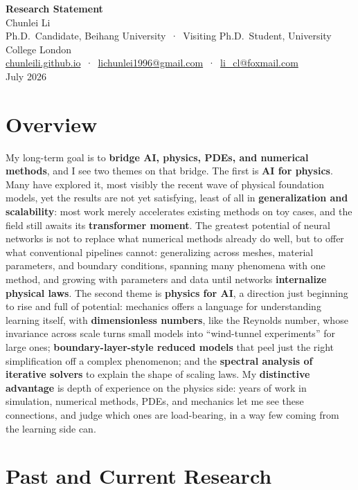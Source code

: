 \documentclass[11pt]{article}
\newcommand{\kw}[1]{\textcolor{linkblue}{\textbf{#1}}}
\begin{document}
\begin{center}
  {\LARGE\bfseries Research Statement}\\[6pt]
  {\large Chunlei Li}\\[2pt]
  Ph.D.\ Candidate, Beihang University \,·\, Visiting Ph.D.\ Student, University College London\\
  \href{https://chunleili.github.io/}{chunleili.github.io} \,·\, \href{mailto:lichunlei1996@gmail.com}{lichunlei1996@gmail.com} \,·\, \href{mailto:li_cl@foxmail.com}{li\_cl@foxmail.com}\\[3pt]
  July 2026
\end{center}

\section{Overview}

My long-term goal is to \kw{bridge AI, physics, PDEs, and numerical methods}, and I see two themes on that bridge. The first is \kw{AI for physics}. Many have explored it, most visibly the recent wave of physical foundation models, yet the results are not yet satisfying, least of all in \kw{generalization and scalability}: most work merely accelerates existing methods on toy cases, and the field still awaits its \kw{transformer moment}. The greatest potential of neural networks is not to replace what numerical methods already do well, but to offer what conventional pipelines cannot: generalizing across meshes, material parameters, and boundary conditions, spanning many phenomena with one method, and growing with parameters and data until networks \kw{internalize physical laws}. The second theme is \kw{physics for AI}, a direction just beginning to rise and full of potential: mechanics offers a language for understanding learning itself, with \kw{dimensionless numbers}, like the Reynolds number, whose invariance across scale turns small models into ``wind-tunnel experiments'' for large ones; \kw{boundary-layer-style reduced models} that peel just the right simplification off a complex phenomenon; and the \kw{spectral analysis of iterative solvers} to explain the shape of scaling laws. My \kw{distinctive advantage} is depth of experience on the physics side: years of work in simulation, numerical methods, PDEs, and mechanics let me see these connections, and judge which ones are load-bearing, in a way few coming from the learning side can.

\section{Past and Current Research}
\end{document}
